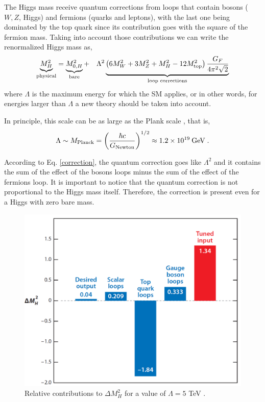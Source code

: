 The Higgs mass receive quantum corrections from loops that contain bosons ($W,Z$, Higgs) and fermions (quarks and leptons), with the last one being dominated by the top quark since its contribution goes with the square of the fermion mass. Taking into account those contributions we can write the renormalized Higgs mass as, \cite{Quigg:2009vq}
\begin{equation}
\underbrace{M_H^2}_{\rm physical} = \underbrace{M_{0,H}^2}_{\rm bare}  + \quad\Lambda^2\underbrace{\left( 6M_W^2 + 3M_Z^2 + M_H^2 - 12 M_{\rm top}^2\right) \frac{G_F}{4\pi^2\sqrt{2}}}_{\text{loop corrections}}  
\label{correction}
\end{equation}
where $\Lambda$ is the maximum energy for which the SM applies, or in other words, for energies larger than $\Lambda$ a new theory should be taken into account. 

In principle, this scale can be as large as the Plank scale , that is,
\begin{equation*}
\Lambda\sim M_{\rm Planck} = \left(\frac{\hbar c}{G_{\rm Newton}}\right)^{1/2} \approx 1.2\times 10^{19}\:{\rm GeV} \; .
\end{equation*}

According to Eq. \ref{correction}, the quantum correction goes like $\Lambda^2$ and it contains the sum of the effect of the bosons loops minus the sum of the effect of the fermions loop. It is important to notice that the quantum correction is not proportional to the Higgs mass itself. Therefore, the correction is present even for a Higgs with zero bare mass. 

\begin{figure}[h]
\centering
\includegraphics[scale=0.23]{figures/theory/deltaMass.pdf}
\caption[Relative contributions to $\Delta M_{H}^2$]{Relative contributions to $\Delta M_{H}^2$ for a value of $\Lambda=5$ TeV \cite{Quigg:2009vq}.}
\label{deltaMass}
\end{figure}

